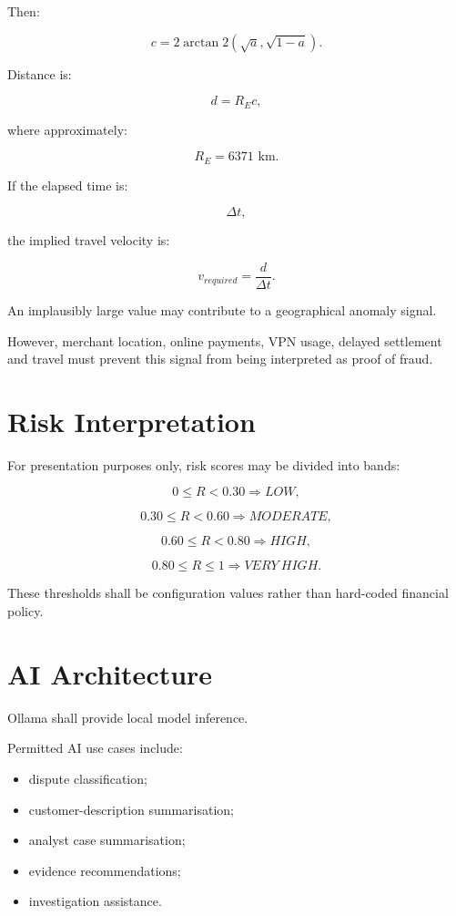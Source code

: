 \documentclass[11pt,a4paper]{article}
\begin{document}
Then:

\[
c
=
2
\arctan2
\left(
\sqrt{a},
\sqrt{1-a}
\right).
\]

Distance is:

\[
d=R_Ec,
\]

where approximately:

\[
R_E=6371\text{ km}.
\]

If the elapsed time is:

\[
\Delta t,
\]

the implied travel velocity is:

\[
v_{required}
=
\frac{d}{\Delta t}.
\]

An implausibly large value may contribute to a geographical anomaly
signal.

However, merchant location, online payments, VPN usage, delayed
settlement and travel must prevent this signal from being interpreted
as proof of fraud.

\section{Risk Interpretation}

For presentation purposes only, risk scores may be divided into
bands:

\[
0\leq R<0.30
\Rightarrow LOW,
\]

\[
0.30\leq R<0.60
\Rightarrow MODERATE,
\]

\[
0.60\leq R<0.80
\Rightarrow HIGH,
\]

\[
0.80\leq R\leq1
\Rightarrow VERY\ HIGH.
\]

These thresholds shall be configuration values rather than hard-coded
financial policy.

\section{AI Architecture}

Ollama shall provide local model inference.

Permitted AI use cases include:

\begin{itemize}
    \item dispute classification;
    \item customer-description summarisation;
    \item analyst case summarisation;
    \item evidence recommendations;
    \item investigation assistance.
\end{itemize}
\end{document}
